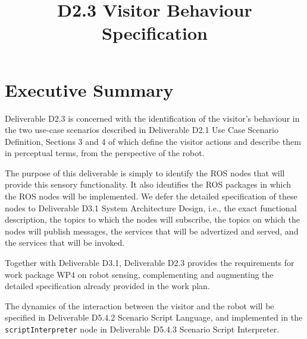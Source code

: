\documentclass{CSSRforAfrica}
\begin{document}



\title{D2.3 Visitor Behaviour Specification}  





\maketitle
 

\section*{Executive Summary}
\label{executive_summary}
 
Deliverable D2.3 is concerned with the identification of the visitor’s behaviour in the two use-case scenarios described in Deliverable D2.1 Use Case Scenario Definition,  Sections 3 and 4 of which define the visitor actions and describe them in perceptual terms, from the perspective of the robot.  

The purpose of this deliverable is simply to identify the ROS nodes that will provide this sensory functionality. It also identifies the ROS packages in which the ROS nodes will be implemented.  We defer the detailed specification of these nodes to Deliverable D3.1 System Architecture Design, i.e., the exact functional description, the topics to which the nodes will subscribe, the topics on which the nodes will publish messages, the services that will be advertized and served, and the services that will be invoked.

Together with Deliverable D3.1, Deliverable D2.3 provides the requirements for work package WP4 on robot sensing, complementing and augmenting the detailed specification already provided in the work plan.  

The dynamics of the interaction between the visitor and the robot will be specified in Deliverable D5.4.2 Scenario Script Language, and implemented in the {\small \verb+scriptInterpreter+} node in Deliverable D5.4.3 Scenario Script Interpreter.
\end{document}
